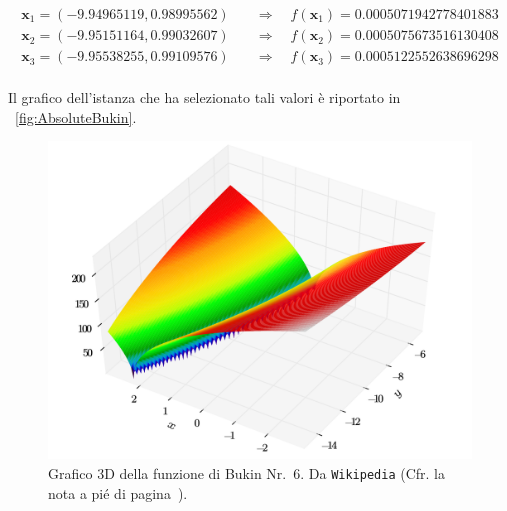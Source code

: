 \begin{align*}
\mathbf{x}_1 = (-9.94965119,  0.98995562) \enspace\enspace &\Longrightarrow \enspace\enspace f(\mathbf{x}_1) = 0.0005071942778401883\\
\mathbf{x}_2 = (-9.95151164,  0.99032607) \enspace\enspace &\Longrightarrow \enspace\enspace f(\mathbf{x}_2) = 0.0005075673516130408\\
\mathbf{x}_3 = (-9.95538255,  0.99109576) \enspace\enspace &\Longrightarrow \enspace\enspace f(\mathbf{x}_3) =0.0005122552638696298\\
\end{align*}

\noindent Il grafico dell'istanza che ha selezionato tali valori è riportato in \figurename~\ref{fig:AbsoluteBukin}.\\

\bigskip

\begin{figure}[h!]
	\centering
	\includegraphics[width=0.85\linewidth]{Immagini/Bukin_function_6.pdf}
	\caption{Grafico 3D della funzione di Bukin Nr.~6. Da \texttt{Wikipedia} (Cfr. la nota a pié di pagina~\pageref{WikipediaFootnote}).}
	\label{fig:BukinPlot}
\end{figure}

